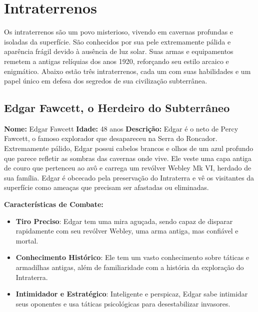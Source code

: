 \section{Intraterrenos}

Os intraterrenos são um povo misterioso, vivendo em cavernas profundas e isoladas da superfície. São conhecidos por sua pele extremamente pálida e aparência frágil devido à ausência de luz solar. Suas armas e equipamentos remetem a antigas relíquias dos anos 1920, reforçando seu estilo arcaico e enigmático. Abaixo estão três intraterrenos, cada um com suas habilidades e um papel único em defesa dos segredos de sua civilização subterrânea.

\subsection{Edgar Fawcett, o Herdeiro do Subterrâneo}
\begin{personagem}
\textbf{Nome:} Edgar Fawcett  
\textbf{Idade:} 48 anos  
\textbf{Descrição:}  
Edgar é o neto de Percy Fawcett, o famoso explorador que desapareceu na Serra do Roncador. Extremamente pálido, Edgar possui cabelos brancos e olhos de um azul profundo que parece refletir as sombras das cavernas onde vive. Ele veste uma capa antiga de couro que pertenceu ao avô e carrega um revólver Webley Mk VI, herdado de sua família. Edgar é obcecado pela preservação do Intraterra e vê os visitantes da superfície como ameaças que precisam ser afastadas ou eliminadas.

\textbf{Características de Combate:}
\begin{itemize}
    \item \textbf{Tiro Preciso}: Edgar tem uma mira aguçada, sendo capaz de disparar rapidamente com seu revólver Webley, uma arma antiga, mas confiável e mortal.
    \item \textbf{Conhecimento Histórico}: Ele tem um vasto conhecimento sobre táticas e armadilhas antigas, além de familiaridade com a história da exploração do Intraterra.
    \item \textbf{Intimidador e Estratégico}: Inteligente e perspicaz, Edgar sabe intimidar seus oponentes e usa táticas psicológicas para desestabilizar invasores.
\end{itemize}
\end{personagem}
